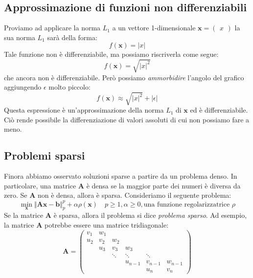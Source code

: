 \documentclass{article}
\begin{document}
        \subsection{Approssimazione di funzioni non differenziabili}
            Proviamo ad applicare la norma $L_1$ a un vettore 1-dimensionale $ \mathbf{x} = \begin{pmatrix}
                x
            \end{pmatrix}$ la sua norma $L_1$ sarà della forma:
            \[f(\mathbf{x}) = |x|\]
            Tale funzione non è differenziabile, ma possiamo riscriverla come segue:
            \[f(\mathbf{x}) = \sqrt{|x|^2}\]
            che ancora non è differenziabile. Però possiamo \emph{ammorbidire} l'angolo del grafico aggiungendo $\epsilon$ molto piccolo:
            \[f(\mathbf{x}) \approx \sqrt{|x|^2} + |\epsilon| \]
            Questa espressione è un'approssimazione della norma $L_1$ di $\mathbf{x}$ ed è differenziabile. Ciò rende possibile 
            la differenziazione di valori assoluti di cui non possiamo fare a meno.

        \subsection{Problemi sparsi}
            Finora abbiamo osservato soluzioni sparse a partire da un problema denso. In particolare, una matrice $\mathbf{A}$ è densa 
            se la maggior parte dei numeri è diversa da zero. Se $\mathbf{A}$ non è densa, allora è sparsa. Consideriamo il seguente problema:
            \[\min_\mathbf{x} \Vert \mathbf{Ax} - \mathbf{b} \Vert_p^p + \alpha\rho(\mathbf{x}) \quad p\geq1, \alpha \geq 0, \text{una funzione regolarizzatrice }\rho\]
            Se la matrice $\mathbf{A}$ è sparsa, allora il problema si dice \emph{problema sparso}. Ad esempio, la matrice $\mathbf{A}$ 
            potrebbe essere una matrice tridiagonale:
            \[\mathbf{A} = \begin{pmatrix}
                v_1 & w_1 & & & & \\
                u_2 & v_2 & w_2 & & & \\
                & u_3 & v_3 & w_3 & & \\
                & & \ddots & \ddots & \ddots & \\
                & & & u_{n-1} & v_{n-1} & w_{n-1} \\
                & & & & u_n & v_n 
            \end{pmatrix}\]
\end{document}
